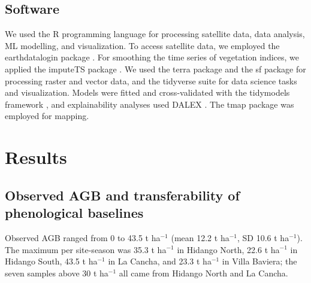 \documentclass[
  british,
]{interact}
\begin{document}
\subsection{Software}\label{software}

We used the R programming language \citep{RCoreTeam2025} for processing
satellite data, data analysis, ML modelling, and visualization. To
access satellite data, we employed the earthdatalogin package
\citep{Boettiger2023}. For smoothing the time series of vegetation
indices, we applied the imputeTS package \citep{Moritz2017}. We used the
terra package \citep{Hijmans2023} and the sf package \citep{Pebesma2018}
for processing raster and vector data, and the tidyverse suite
\citep{Wickham2019} for data science tasks and visualization. Models
were fitted and cross-validated with the tidymodels framework
\citep{Kuhn2020}, and explainability analyses used DALEX
\citep{Biecek2018}. The tmap package \citep{Tennekes2018} was employed
for mapping.

\section{Results}\label{results}

\subsection{Observed AGB and transferability of phenological
baselines}\label{observed-agb-and-transferability-of-phenological-baselines}

Observed AGB ranged from 0 to 43.5 t ha\(^{-1}\) (mean 12.2 t
ha\(^{-1}\), SD 10.6 t ha\(^{-1}\)). The maximum per site-season was
35.3 t ha\(^{-1}\) in Hidango North, 22.6 t ha\(^{-1}\) in Hidango
South, 43.5 t ha\(^{-1}\) in La Cancha, and 23.3 t ha\(^{-1}\) in Villa
Baviera; the seven samples above 30 t ha\(^{-1}\) all came from Hidango
North and La Cancha.
\end{document}
